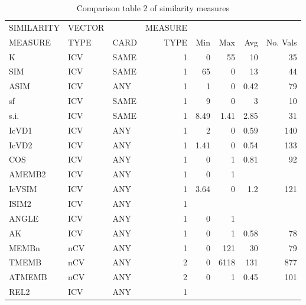 \documentclass{article}
\begin{document}
\begin{table}[htb]
\caption{Comparison table 2 of similarity measures} 
\begin{center}
\begin{tabular}{lllrrrrr}
\hline
 SIMILARITY  &  VECTOR  &        &  MEASURE  &        &        &        &            \\
 MEASURE     &  TYPE    &  CARD  &     TYPE  &   Min  &   Max  &   Avg  &  No. Vals  \\
\hline
 K           &  ICV     &  SAME  &        1  &     0  &    55  &    10  &        35  \\
 SIM         &  ICV     &  SAME  &        1  &    65  &     0  &    13  &        44  \\
 ASIM        &  ICV     &  ANY   &        1  &     1  &     0  &  0.42  &        79  \\
\hline
 sf          &  ICV     &  SAME  &        1  &     9  &     0  &     3  &        10  \\
\hline
 s.i.        &  ICV     &  SAME  &        1  &  8.49  &  1.41  &  2.85  &        31  \\
\hline
 IcVD1       &  ICV     &  ANY   &        1  &     2  &     0  &  0.59  &       140  \\
 IcVD2       &  ICV     &  ANY   &        1  &  1.41  &     0  &  0.54  &       133  \\
 COS         &  ICV     &  ANY   &        1  &     0  &     1  &  0.81  &        92  \\
\hline
 AMEMB2      &  ICV     &  ANY   &        1  &     0  &     1  &        &            \\
 IcVSIM      &  ICV     &  ANY   &        1  &  3.64  &     0  &   1.2  &       121  \\
 ISIM2       &  ICV     &  ANY   &        1  &        &        &        &            \\
 ANGLE       &  ICV     &  ANY   &        1  &     0  &     1  &        &            \\
\hline
 AK          &  ICV     &  ANY   &        1  &     0  &     1  &  0.58  &        78  \\
 MEMBn       &  nCV     &  ANY   &        1  &     0  &   121  &    30  &        79  \\
 TMEMB       &  nCV     &  ANY   &        2  &     0  &  6118  &   131  &       877  \\
 ATMEMB      &  nCV     &  ANY   &        2  &     0  &     1  &  0.45  &       101  \\
\hline
 REL2        &  ICV     &  ANY   &        1  &        &        &        &            \\

\end{tabular}
\end{center}
\end{table}
\end{document}

